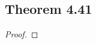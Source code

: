 \documentclass[../../main.tex]{subfiles}
\begin{document}
\subsection{Theorem 4.41}
\begin{wts}

\end{wts}
\begin{proof}

\end{proof}
\end{document}
